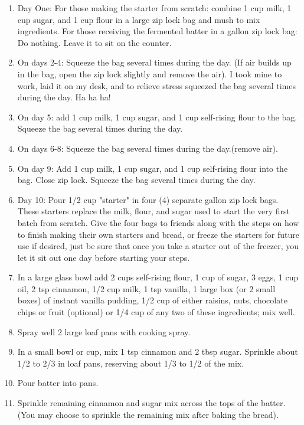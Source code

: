 \documentclass[11pt, twoside, openany]{book}
\begin{document}
\vspace{-3mm}\begin{enumerate}\setlength\itemsep{-1mm}
\item Day One: For those making the starter from scratch: combine 1 cup milk, 1 cup sugar, and 1 cup flour in a large zip lock bag and mush to mix ingredients. For those receiving the fermented batter in a gallon zip lock bag: Do nothing. Leave it to sit on the counter.
\item On days 2-4: Squeeze the bag several times during the day. (If air builds up in the bag, open the zip lock slightly and remove the air). I took mine to work, laid it on my desk, and to relieve stress squeezed the bag several times during the day. Ha ha ha!
\item On day 5: add 1 cup milk, 1 cup sugar, and 1 cup self-rising flour to the bag. Squeeze the bag several times during the day.
\item On days 6-8: Squeeze the bag several times during the day.(remove air).
\item On day 9: Add 1 cup milk, 1 cup sugar, and 1 cup self-rising flour into the bag. Close zip lock. Squeeze the bag several times during the day.
\item Day 10: Pour 1/2 cup "starter" in four (4) separate gallon zip lock bags. These starters replace the milk, flour, and sugar used to start the very first batch from scratch. Give the four bags to friends along with the steps on how to finish making their own starters and bread, or freeze the starters for future use if desired, just be sure that once you take a starter out of the freezer, you let it sit out one day before starting your steps.
\item In a large glass bowl add 2 cups self-rising flour, 1 cup of sugar, 3 eggs, 1 cup oil, 2 tsp cinnamon, 1/2 cup milk, 1 tsp vanilla, 1 large box (or 2 small boxes) of instant vanilla pudding, 1/2 cup of either raisins, nuts, chocolate chips or fruit (optional) or 1/4 cup of any two of these ingredients; mix well.
\item Spray well 2 large loaf pans with cooking spray.
\item In a small bowl or cup, mix 1 tsp cinnamon and 2 tbsp sugar. Sprinkle about 1/2 to 2/3 in loaf pans, reserving about 1/3 to 1/2 of the mix.
\item Pour batter into pans.
\item Sprinkle remaining cinnamon and sugar mix across the tops of the batter.(You may choose to sprinkle the remaining mix after baking the bread).

\end{enumerate}
\end{document}
